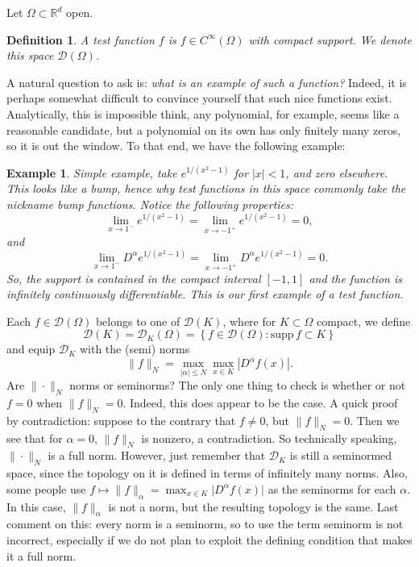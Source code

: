 \documentclass[letterpaper,twoside,11pt]{article}
\theoremstyle{mystyle}
\newtheorem{definition}{Definition}[section]
\newtheorem*{ex}{Example}
\newcommand{\R}{{\mathbb R}}
\newcommand{\cg}{\color{gray}}
\newcommand{\cbk}{\color{black}}
\newcommand{\cblu}{\color{blue}}
\begin{document}
Let $\Omega \subset \R^d$ open. 
\begin{definition}
  A test function $f$ is $f\in C^\infty(\Omega)$ with compact support. We denote this space $\mathcal D (\Omega)$. 
\end{definition}
A natural question to ask is: \textit{what is an example of such a function?} Indeed, it is perhaps somewhat difficult to convince yourself that such nice functions exist. Analytically, this is impossible \cg think, any polynomial, for example, seems like a reasonable candidate, but a polynomial on its own has only finitely many zeros, so it is out the window. \cbk To that end, we have the following example: 
\begin{ex}
  Simple example, take $e^{1/(x^2-1)}$ for $|x|<1$, and zero elsewhere. This looks like a bump, hence why test functions in this space commonly take the nickname bump functions. Notice the following properties: 
  \[\lim_{x\to 1^-}e^{1/(x^2-1)} = \lim_{x\to -1^+}e^{1/(x^2-1)}= 0,\] 
  and
  \[\lim_{x\to 1^-}D^\alpha e^{1/(x^2-1)} = \lim_{x\to -1^+}D^\alpha e^{1/(x^2-1)}= 0.\]
  So, the support is contained in the compact interval $[-1,1]$ and the function is infinitely continuously differentiable. This is our first example of a test function. 
\end{ex}
Each $f\in \mathcal D(\Omega)$ belongs to one of $\mathcal D (K)$, where for $K\subset \Omega$ compact, we define 
\[\mathcal D (K) = \mathcal D_K(\Omega) = \left\{ f\in \mathcal D(\Omega) : \text{supp}\, f \subset K\right\}\]
and equip $\mathcal D_K$ with the (semi) norms 
\[\|f\|_N = \max_{|\alpha|\leq N} \max_{x\in K} \left\vert D^\alpha f(x) \right\vert.\]
\cg Are $\|\cdot \|_N$ norms or seminorms? The only one thing to check is whether or not $f =0$ when $\|f\|_N = 0$. Indeed, this does appear to be the case. A quick proof by contradiction: suppose to the contrary that $f \neq 0$, but $\|f\|_N = 0$. Then we see that for $\alpha = 0$, $\|f\|_N$ is nonzero, a contradiction. So technically speaking, $\|\cdot\|_N$ is a full norm. \cblu However, just remember that $\mathcal D_K$ is still a seminormed space, since the topology on it is defined in terms of infinitely many norms. Also, some people use $f \mapsto \|f\|_\alpha = \max_{x\in K} \vert D^\alpha f (x) \vert $ as the seminorms for each $\alpha$. In this case, $\|f\|_\alpha$ is not a norm, but the resulting topology is the same. \cg Last comment on this: every norm is a seminorm, so to use the term seminorm is not incorrect, especially if we do not plan to exploit the defining condition that makes it a full norm. \cbk
\end{document}
